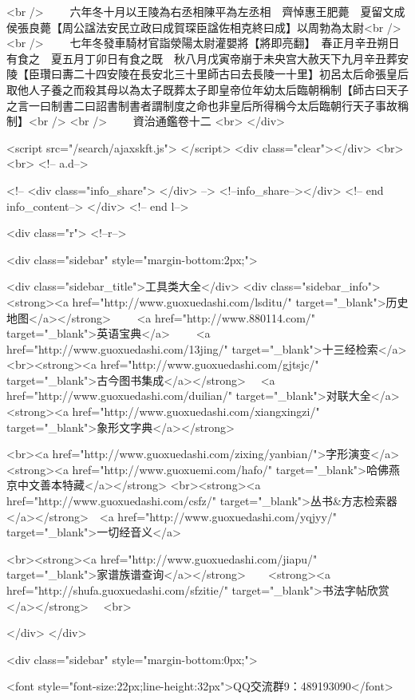 <br />
　　六年冬十月以王陵為右丞相陳平為左丞相　齊悼惠王肥薨　夏留文成侯張良薨【周公諡法安民立政曰成賀琛臣諡佐相克終曰成】以周勃為太尉<br />
<br />
　　七年冬發車騎材官詣滎陽太尉灌嬰將【將即亮翻】　春正月辛丑朔日有食之　夏五月丁卯日有食之既　秋八月戊寅帝崩于未央宫大赦天下九月辛丑葬安陵【臣瓚曰夀二十四安陵在長安北三十里師古曰去長陵一十里】初呂太后命張皇后取他人子養之而殺其母以為太子既葬太子即皇帝位年幼太后臨朝稱制【師古曰天子之言一曰制書二曰詔書制書者謂制度之命也非皇后所得稱今太后臨朝行天子事故稱制】<br />
<br />
　　資治通鑑卷十二  <br>
   </div> 

<script src="/search/ajaxskft.js"> </script>
 <div class="clear"></div>
<br>
<br>
 <!-- a.d-->

 <!--
<div class="info_share">
</div> 
-->
 <!--info_share--></div>   <!-- end info_content-->
  </div> <!-- end l-->

<div class="r">   <!--r-->



<div class="sidebar"  style="margin-bottom:2px;">

 
<div class="sidebar_title">工具类大全</div>
<div class="sidebar_info">
<strong><a href="http://www.guoxuedashi.com/lsditu/" target="_blank">历史地图</a></strong>　　
<a href="http://www.880114.com/" target="_blank">英语宝典</a>　　
<a href="http://www.guoxuedashi.com/13jing/" target="_blank">十三经检索</a>　
<br><strong><a href="http://www.guoxuedashi.com/gjtsjc/" target="_blank">古今图书集成</a></strong>　
<a href="http://www.guoxuedashi.com/duilian/" target="_blank">对联大全</a>　<strong><a href="http://www.guoxuedashi.com/xiangxingzi/" target="_blank">象形文字典</a></strong>　

<br><a href="http://www.guoxuedashi.com/zixing/yanbian/">字形演变</a>　　<strong><a href="http://www.guoxuemi.com/hafo/" target="_blank">哈佛燕京中文善本特藏</a></strong>
<br><strong><a href="http://www.guoxuedashi.com/csfz/" target="_blank">丛书&方志检索器</a></strong>　<a href="http://www.guoxuedashi.com/yqjyy/" target="_blank">一切经音义</a>　　

<br><strong><a href="http://www.guoxuedashi.com/jiapu/" target="_blank">家谱族谱查询</a></strong>　　<strong><a href="http://shufa.guoxuedashi.com/sfzitie/" target="_blank">书法字帖欣赏</a></strong>　
<br>

</div>
</div>


<div class="sidebar" style="margin-bottom:0px;">

<font style="font-size:22px;line-height:32px">QQ交流群9：489193090</font>


